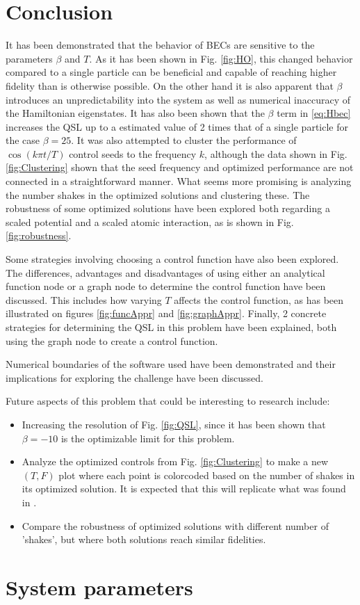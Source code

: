 \documentclass[a4paper, twocolumn]{revtex4-1}
\begin{document}
\section{\label{sec:conclusion}Conclusion}
It has been demonstrated that the behavior of BECs are sensitive to the parameters $\beta$ and $T$. As it has been shown in Fig. \ref{fig:HO}, this changed behavior compared to a single particle can be beneficial and capable of reaching higher fidelity than is otherwise possible. On the other hand it is also apparent that $\beta$ introduces an unpredictability into the system as well as numerical inaccuracy of the Hamiltonian eigenstates. It has also been shown that the $\beta$ term in \eqref{eq:Hbec} increases the QSL up to a estimated value of 2 times that of a single particle for the case $\beta=25$. It was also attempted to cluster the performance of $\cos(k\pi t/T)$ control seeds to the frequency $k$, although the data shown in Fig. \ref{fig:Clustering} shown that the seed frequency and optimized performance are not connected in a straightforward manner. What seems more promising is analyzing the number shakes in the optimized solutions and clustering these. The robustness of some optimized solutions have been explored both regarding a scaled potential and a scaled atomic interaction, as is shown in Fig. \ref{fig:robustness}.

Some strategies involving choosing a control function have also been explored. The differences, advantages and disadvantages of using either an analytical function node or a graph node to determine the control function have been discussed. This includes how varying $T$ affects the control function, as has been illustrated on figures \ref{fig:funcAppr} and \ref{fig:graphAppr}. Finally, 2 concrete strategies for determining the QSL in this problem have been explained, both using the graph node to create a control function.

Numerical boundaries of the software used have been demonstrated and their implications for exploring the challenge have been discussed.

Future aspects of this problem that could be interesting to research include:
\begin{itemize}
	\item Increasing the resolution of Fig. \ref{fig:QSL}, since it has been shown that $\beta=-10$ is the optimizable limit for this problem.
	\item Analyze the optimized controls from Fig. \ref{fig:Clustering} to make a new $(T,F)$ plot where each point is colorcoded based on the number of shakes in its optimized solution. It is expected that this will replicate what was found in \cite{QM2Paper}.
	\item Compare the robustness of optimized solutions with different number of 'shakes', but where both solutions reach similar fidelities.
\end{itemize}



\appendix
\section{System parameters}
\end{document}
